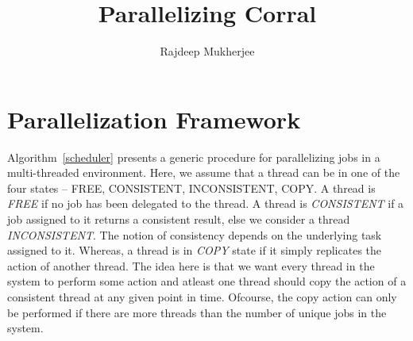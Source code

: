 \documentclass{article}
\newcommand{\Omit}[1]{}
\begin{document}
\title{Parallelizing Corral}
\author{Rajdeep Mukherjee}

\maketitle
\Omit{
\section{Termination in Corral}
Currently, Corral terminates in either of the following two conditions.
\begin{enumerate}
\item Satisfiable Under-approximate query proving that the program has bugs.
\item Unsatisfiable Over-approximate query proving that the program is safe.
\end{enumerate}

Additionally, the procedure can also terminate if one of the following two conditions holds true.
\begin{enumerate}
\item Unsatisfiable Under-approximate query given that the query does not contain any blocking call sites.
\item Satisfiable Over-approximate query given that the query does not contain any blocking call sites.
\end{enumerate}

The above optimisation would save us one solver query. 
}
\section{Parallelization Framework}
Algorithm~\ref{scheduler} presents a generic procedure for parallelizing jobs 
in a multi-threaded environment. Here, we assume that a thread can be in one of the 
four states -- {FREE, CONSISTENT, INCONSISTENT, COPY}. A thread is \emph{FREE}
if no job has been delegated to the thread. A thread is \emph{CONSISTENT} if 
a job assigned to it returns a consistent result, else we consider a thread 
\emph{INCONSISTENT}. The notion of consistency depends on the underlying task 
assigned to it. Whereas, a thread is in \emph{COPY} state if it simply replicates 
the action of another thread.  The idea here is that we want every thread in the 
system to perform some action and atleast one thread should copy the action of a 
consistent thread at any given point in time. Ofcourse, the copy action can only 
be performed if there are more threads than the number of unique jobs in the system.
\end{document}
